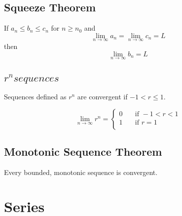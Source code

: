 \documentclass[12pt]{article}
\begin{document}
\subsection{Squeeze Theorem}

If $a_n \leq b_n \leq c_n$ for $n \geq n_0$ and
$$\lim_{n\to\infty} a_n = \lim_{n\to\infty} c_n = L$$
then
$$\lim_{n\to\infty} b_n = L$$


\subsection{${r^n} sequences$}

Sequences defined as ${r^n}$ are convergent if $-1 < r \leq 1$.

\[ \lim_{n\to\infty} r^n =
    \begin{cases}
        0 & \quad \text{if } -1 < r < 1\\
        1 & \quad \text{if } r = 1\\
    \end{cases}
\]


\subsection{Monotonic Sequence Theorem}

Every bounded, monotonic sequence is convergent.


\section{Series}
\end{document}
